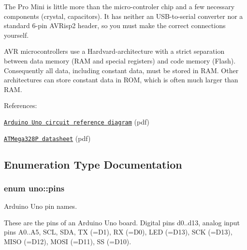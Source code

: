 The Pro Mini is little more than the micro-\/controler chip and a few necessary components (crystal, capacitors). It has neither an U\+S\+B-\/to-\/serial converter nor a standard 6-\/pin A\+V\+Risp2 header, so you must make the correct connections yourself.



A\+VR microcontrollers use a Hardvard-\/architecture with a strict separation between data memory (R\+AM and special registers) and code memory (Flash). Consequently all data, including constant data, must be stored in R\+AM. Other architectures can store constant data in R\+OM, which is often much larger than R\+AM.

References\+:
\begin{DoxyItemize}
\item \href{https://www.arduino.cc/en/uploads/Main/arduino-uno-schematic.pdf}{\tt Arduino Uno circuit reference diagram} (pdf)
\item \href{http://www.atmel.com/images/atmel-8271-8-bit-avr-microcontroller-atmega48a-48pa-88a-88pa-168a-168pa-328-328p_datasheet_complete.pdf}{\tt A\+T\+Mega328P datasheet} (pdf) 
\end{DoxyItemize}

\subsection{Enumeration Type Documentation}
\subsubsection[{\texorpdfstring{pins}{pins}}]{\setlength{\rightskip}{0pt plus 5cm}enum {\bf uno\+::pins}\hspace{0.3cm}{\ttfamily [strong]}}\hypertarget{namespaceuno_a0a859f3512bcc3027a090ae07befd5b2}{}\label{namespaceuno_a0a859f3512bcc3027a090ae07befd5b2}


Arduino Uno pin names. 

These are the pins of an Arduino Uno board. Digital pins d0..d13, analog input pins A0..A5, S\+CL, S\+DA, TX (=D1), RX (=D0), L\+ED (=D13), S\+CK (=D13), M\+I\+SO (=D12), M\+O\+SI (=D11), SS (=D10). 